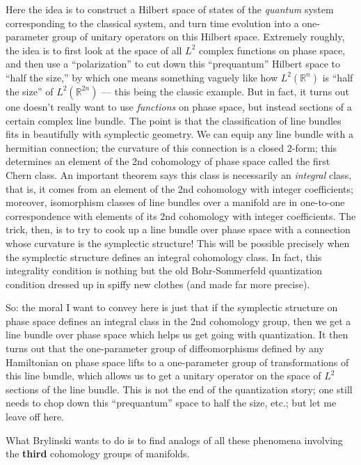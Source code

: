 \documentclass[12pt]{article}
\begin{document}
Here the idea is to construct a Hilbert space of states of the
\emph{quantum} system corresponding to the classical system, and turn
time evolution into a one-parameter group of unitary operators on this
Hilbert space. Extremely roughly, the idea is to first look at the space
of all \(L^2\) complex functions on phase space, and then use a
``polarization'' to cut down this ``prequantum'' Hilbert space to ``half
the size,'' by which one means something vaguely like how
\(L^2(\mathbb{R}^n)\) is ``half the size'' of \(L^2(\mathbb{R}^{2n})\)
--- this being the classic example. But in fact, it turns out one
doesn't really want to use \emph{functions} on phase space, but instead
sections of a certain complex line bundle. The point is that the
classification of line bundles fits in beautifully with symplectic
geometry. We can equip any line bundle with a hermitian connection; the
curvature of this connection is a closed \(2\)-form; this determines an
element of the 2nd cohomology of phase space called the first Chern
class. An important theorem says this class is necessarily an
\emph{integral} class, that is, it comes from an element of the 2nd
cohomology with integer coefficients; moreover, isomorphism classes of
line bundles over a manifold are in one-to-one correspondence with
elements of its 2nd cohomology with integer coefficients. The trick,
then, is to try to cook up a line bundle over phase space with a
connection whose curvature is the symplectic structure! This will be
possible precisely when the symplectic structure defines an integral
cohomology class. In fact, this integrality condition is nothing but the
old Bohr-Sommerfeld quantization condition dressed up in spiffy new
clothes (and made far more precise).

So: the moral I want to convey here is just that if the symplectic
structure on phase space defines an integral class in the 2nd cohomology
group, then we get a line bundle over phase space which helps us get
going with quantization. It then turns out that the one-parameter group
of diffeomorphisms defined by any Hamiltonian on phase space lifts to a
one-parameter group of transformations of this line bundle, which allows
us to get a unitary operator on the space of \(L^2\) sections of the
line bundle. This is not the end of the quantization story; one still
needs to chop down this ``prequantum'' space to half the size, etc.; but
let me leave off here.

What Brylinski wants to do is to find analogs of all these phenomena
involving the \textbf{third} cohomology groups of manifolds.
\end{document}
